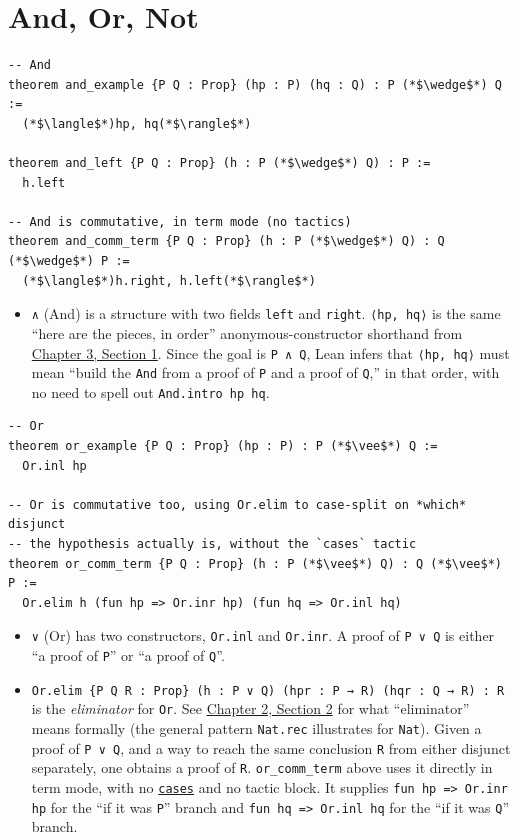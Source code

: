 \section{And, Or, Not}\label{sec:04-propositions-and-proofs:05-and-or-not:1}

\begin{lstlisting}
-- And
theorem and_example {P Q : Prop} (hp : P) (hq : Q) : P (*$\wedge$*) Q :=
  (*$\langle$*)hp, hq(*$\rangle$*)

theorem and_left {P Q : Prop} (h : P (*$\wedge$*) Q) : P :=
  h.left

-- And is commutative, in term mode (no tactics)
theorem and_comm_term {P Q : Prop} (h : P (*$\wedge$*) Q) : Q (*$\wedge$*) P :=
  (*$\langle$*)h.right, h.left(*$\rangle$*)
\end{lstlisting}

\begin{itemize}
\tightlist
\item
  \texttt{∧} (And) is a structure with two fields \texttt{left} and \texttt{right}. \texttt{⟨hp, hq⟩} is the same ``here are the pieces, in order'' anonymous-constructor shorthand from \hyperref[sec:03-functions-and-structures:01-structure-basics:1]{Chapter 3, Section 1}. Since the goal is \texttt{P ∧ Q}, Lean infers that \texttt{⟨hp, hq⟩} must mean ``build the \texttt{And} from a proof of \texttt{P} and a proof of \texttt{Q},'' in that order, with no need to spell out \texttt{And.intro hp hq}.
\end{itemize}

\begin{lstlisting}
-- Or
theorem or_example {P Q : Prop} (hp : P) : P (*$\vee$*) Q :=
  Or.inl hp

-- Or is commutative too, using Or.elim to case-split on *which* disjunct
-- the hypothesis actually is, without the `cases` tactic
theorem or_comm_term {P Q : Prop} (h : P (*$\vee$*) Q) : Q (*$\vee$*) P :=
  Or.elim h (fun hp => Or.inr hp) (fun hq => Or.inl hq)
\end{lstlisting}

\begin{itemize}
\tightlist
\item
  \texttt{∨} (Or) has two constructors, \texttt{Or.inl} and \texttt{Or.inr}. A proof of \texttt{P ∨ Q} is either ``a proof of \texttt{P}'' or ``a proof of \texttt{Q}''.
\item
  \texttt{Or.elim \{P Q R : Prop\} (h : P ∨ Q) (hpr : P → R) (hqr : Q → R) : R} is the \emph{eliminator} for \texttt{Or}. See \hyperref[sec:02-terminology-and-coc:02-pi-sigma-and-coc:1]{Chapter 2, Section 2} for what ``eliminator'' means formally (the general pattern \texttt{Nat.rec} illustrates for \texttt{Nat}). Given a proof of \texttt{P ∨ Q}, and a way to reach the same conclusion \texttt{R} from either disjunct separately, one obtains a proof of \texttt{R}. \texttt{or\_\allowbreak{}comm\_\allowbreak{}term} above uses it directly in term mode, with no \href{https://lean-lang.org/doc/reference/latest/Tactic-Proofs/Tactic-Reference/}{\texttt{cases}} and no tactic block. It supplies \texttt{fun hp => Or.inr hp} for the ``if it was \texttt{P}'' branch and \texttt{fun hq => Or.inl hq} for the ``if it was \texttt{Q}'' branch.
\end{itemize}

